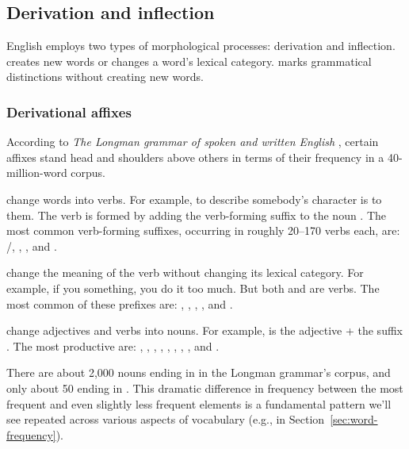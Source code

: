 \subsection{Derivation and inflection} \label{sec:derivation}

English employs two types of morphological processes: derivation and inflection.  creates new words or changes a word's lexical category.  marks grammatical distinctions without creating new words.

\subsubsection*{Derivational affixes}

According to \textit{The Longman grammar of spoken and written English} \citep[401]{Biber1999}, certain affixes stand head and shoulders above others in terms of their frequency in a 40-million-word corpus.

 change words into verbs. For example, to describe somebody's character is to  them. The verb  is formed by adding the verb-forming suffix  to the noun . The most common verb-forming suffixes, occurring in roughly 20--170 verbs each, are: \mbox{}/\mbox{}, \mbox{}, \mbox{}, and \mbox{}.

 change the meaning of the verb without changing its lexical category. For example, if you  something, you do it too much. But both  and  are verbs. The most common of these prefixes are: , , , , and  \citep[400]{Biber1999}.

 change adjectives and verbs into nouns. For example,  is the adjective  + the suffix . The most productive are: , , , , , , , , and .

There are about 2,000 nouns ending in  in the Longman grammar's corpus, and only about 50 ending in . This dramatic difference in frequency between the most frequent and even slightly less frequent elements is a fundamental pattern we'll see repeated across various aspects of vocabulary (e.g., in Section~\ref{sec:word-frequency}).

